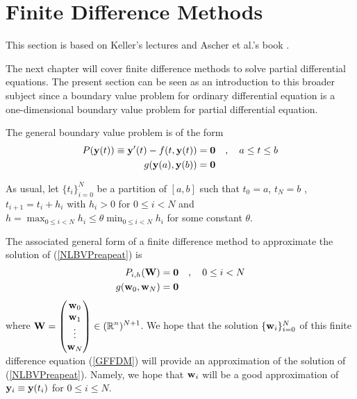 \section{Finite Difference Methods}

This section is based on Keller's lectures \cite{K} and Ascher et
al.'s book \cite{AMR}.

The next chapter will cover finite difference methods to solve partial
differential equations.  The present section can be seen as an
introduction to this broader subject since a boundary value problem
for ordinary differential equation is a one-dimensional boundary value
problem for partial differential equation.

The general boundary value problem is of the form
\begin{equation}\label{NLBVPreapeat}
\begin{split}
P(\mathbf{y}(t)) \equiv \mathbf{y}'(t) - f(t,\mathbf{y}(t)) &= \mathbf{0}
\quad , \quad a \leq t \leq b\\
g(\mathbf{y}(a), \mathbf{y}(b)) &= \mathbf{0}
\end{split}
\end{equation}

As usual, let $\{t_i\}_{i=0}^N$ be a partition of $[a,b]$ such that
$t_0 = a$, $t_N = b$ , $t_{i+1} = t_i + h_i$ with $h_i > 0$
for $0\leq i < N$ and
$\displaystyle h = \max_{0\leq i < N} h_i \leq \theta \min_{0\leq i < N} h_i$
for some constant $\theta$.

The associated general form of a finite difference method to
approximate the solution of (\ref{NLBVPreapeat}) is
\begin{equation} \label{GFFDM}
\begin{split}
P_{i,h}(\mathbf{W}) &= \mathbf{0}
\quad , \quad 0 \leq i < N \\
g(\mathbf{w}_0, \mathbf{w}_N) &= \mathbf{0}
\end{split}
\end{equation}
where $\displaystyle \mathbf{W} =
\begin{pmatrix} \mathbf{w}_0 \\ \mathbf{w}_1 \\ \vdots \\
\mathbf{w}_N \end{pmatrix} \in (\mathbb{R}^n)^{N+1}$.
We hope that the solution $\{\mathbf{w}_i\}_{i=0}^N$ of this finite
difference equation (\ref{GFFDM}) will provide an approximation of the
solution of (\ref{NLBVPreapeat}).  Namely, we hope that
$\mathbf{w}_i$ will be a good approximation of
$\mathbf{y}_i \equiv \mathbf{y}(t_i)$ for $0 \leq i \leq N$.

